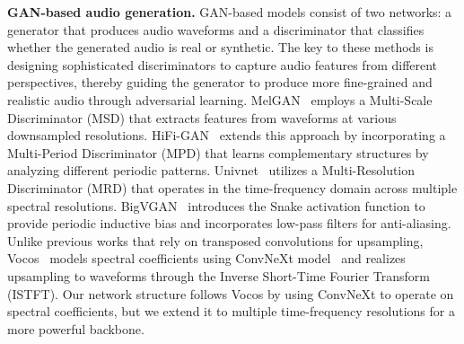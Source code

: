 \documentclass{article} %
\begin{document}
\noindent\textbf{GAN-based audio generation.} GAN-based models consist of two networks: a generator that produces audio waveforms and a discriminator that classifies whether the generated audio is real or synthetic. The key to these methods is designing sophisticated discriminators to capture audio features from different perspectives, thereby guiding the generator to produce more fine-grained and realistic audio through adversarial learning. 
MelGAN~\citep{melgan} employs a Multi-Scale Discriminator (MSD) that extracts features from waveforms at various downsampled resolutions. HiFi-GAN~\citep{hifigan} extends this approach by incorporating a Multi-Period Discriminator (MPD) that learns complementary structures by analyzing different periodic patterns. Univnet~\citep{mrd} utilizes a Multi-Resolution Discriminator (MRD) that operates in the time-frequency domain across multiple spectral resolutions. BigVGAN~\citep{bigvgan} introduces the Snake activation function to provide periodic inductive bias and incorporates low-pass filters for anti-aliasing. Unlike previous works that rely on transposed convolutions for upsampling, Vocos~\citep{vocos} models spectral coefficients using ConvNeXt model~\citep{convnext} and realizes upsampling to waveforms through the Inverse Short-Time Fourier Transform (ISTFT). Our network structure follows Vocos by using ConvNeXt to operate on spectral coefficients, but we extend it to multiple time-frequency resolutions for a more powerful backbone.
\end{document}
